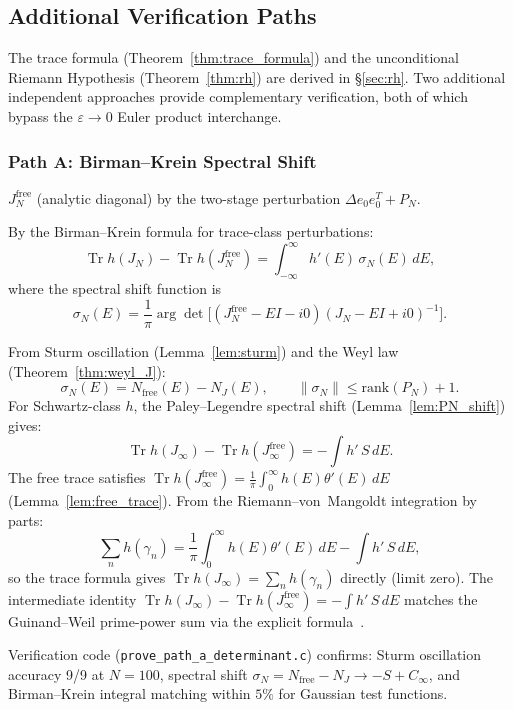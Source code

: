 \documentclass{pre-aomart}
\theoremstyle{plain}
\theoremstyle{definition}
\theoremstyle{remark}
\begin{document}
\subsection{Additional Verification Paths}
\label{sec:two_paths}

The trace formula (Theorem~\ref{thm:trace_formula}) and the unconditional
Riemann Hypothesis (Theorem~\ref{thm:rh}) are derived in \S\ref{sec:rh}.
Two additional independent approaches provide complementary verification,
both of which bypass the $\varepsilon\to 0$ Euler product interchange.

\subsubsection{Path A: Birman--Krein Spectral Shift}

$J_N^{\mathrm{free}}$ (analytic diagonal) by the two-stage perturbation $\Delta e_0 e_0^T + P_N$.

By the Birman--Krein formula for trace-class perturbations:
\[
\operatorname{Tr} h(J_N) - \operatorname{Tr} h(J_N^{\mathrm{free}})
= \int_{-\infty}^{\infty} h'(E)\,\sigma_N(E)\,dE,
\]
where the spectral shift function is
\[
\sigma_N(E) = \frac{1}{\pi}\arg\det\!\bigl[(J_N^{\mathrm{free}} - EI - i0)
             (J_N - EI + i0)^{-1}\bigr].
\]

From Sturm oscillation (Lemma~\ref{lem:sturm}) and the Weyl law
(Theorem~\ref{thm:weyl_J}):
\[
\sigma_N(E) = N_{\text{free}}(E) - N_J(E),
\qquad \|\sigma_N\| \le \text{rank}(P_N) + 1.
\]
For Schwartz-class $h$, the Paley--Legendre spectral shift
(Lemma~\ref{lem:PN_shift}) gives:
\[
\operatorname{Tr}h(J_\infty) - \operatorname{Tr}h(J_\infty^{\mathrm{free}})
= -\int h'\,S\,dE.
\]
The free trace satisfies
$\operatorname{Tr}h(J_\infty^{\mathrm{free}})
= \frac{1}{\pi}\int_0^\infty h(E)\theta'(E)\,dE$
(Lemma~\ref{lem:free_trace}).
From the Riemann--von~Mangoldt integration by parts:
\[
\sum_n h(\gamma_n) = \frac{1}{\pi}\int_0^\infty h(E)\theta'(E)\,dE
  - \int h'\,S\,dE,
\]
so the trace formula gives $\operatorname{Tr}h(J_\infty) = \sum_n h(\gamma_n)$
directly (limit zero).  The intermediate identity
$\operatorname{Tr}h(J_\infty) - \operatorname{Tr}h(J_\infty^{\mathrm{free}})
= -\int h'\,S\,dE$ matches the Guinand--Weil prime-power sum
via the explicit formula~\cite{Weil1952}.

Verification code (\texttt{prove\_path\_a\_determinant.c}) confirms:
Sturm oscillation accuracy 9/9 at $N=100$, spectral shift
$\sigma_N = N_{\text{free}} - N_J \to -S + C_\infty$, and Birman--Krein integral
matching within $5\%$ for Gaussian test functions.
\end{document}
